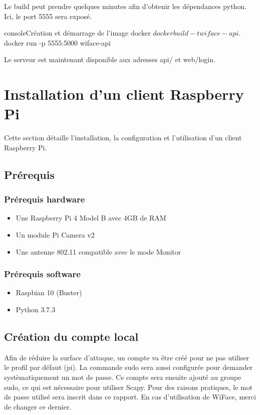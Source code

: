 Le build peut prendre quelques minutes afin d'obtenir les dépendances python.
Ici, le port 5555 sera exposé.
\begin{listingsbox}{console}{Création et démarrage de l'image docker}
$ docker build -t wiface-api .
$ docker run -p 5555:5000 wiface-api
\end{listingsbox}

Le serveur est maintenant disponible aux adresses api/ et web/login.

\section{Installation d'un client Raspberry Pi}
Cette section détaille l'installation, la configuration et l'utilisation d'un client Raspberry Pi.

\subsection{Prérequis}

\subsubsection{Prérequis hardware}
\begin{itemize}
    \item Une Raspberry Pi 4 Model B avec 4GB de RAM
    \item Un module Pi Camera v2
    \item Une antenne 802.11 compatible avec le mode Monitor
\end{itemize}

\subsubsection{Prérequis software}
\begin{itemize}
    \item Raspbian 10 (Buster)
    \item Python 3.7.3
\end{itemize}

\subsection{Création du compte local}
Afin de réduire la surface d'attaque, un compte va être créé pour ne pas utiliser
le profil par défaut (pi).
La commande sudo sera aussi configurée pour demander systèmatiquement un mot de passe.
Ce compte sera ensuite ajouté au groupe sudo, ce qui est nécessaire pour utiliser Scapy.
Pour des raisons pratiques, le mot de passe utilisé sera inscrit dans ce rapport. En cas d'utilisation de WiFace, merci de changer ce dernier.

